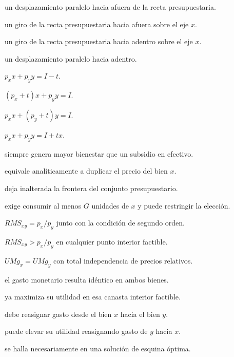 \begin{opts}
    \item un desplazamiento paralelo hacia afuera de la recta presupuestaria.
    \item un giro de la recta presupuestaria hacia afuera sobre el eje $x$.
    \item un giro de la recta presupuestaria hacia adentro sobre el eje $x$.
    \item un desplazamiento paralelo hacia adentro.
\end{opts}

\begin{opts}
    \item $p_xx+p_yy=I-t$.
    \item $(p_x+t)x+p_yy=I$.
    \item $p_xx+(p_y+t)y=I$.
    \item $p_xx+p_yy=I+tx$.
\end{opts}

\begin{opts}
    \item siempre genera mayor bienestar que un subsidio en efectivo.
    \item equivale analíticamente a duplicar el precio del bien $x$.
    \item deja inalterada la frontera del conjunto presupuestario.
    \item exige consumir al menos $G$ unidades de $x$ y puede restringir la elección.
\end{opts}

\begin{opts}
    \item $RMS_{xy}=p_x/p_y$ junto con la condición de segundo orden.
    \item $RMS_{xy}>p_x/p_y$ en cualquier punto interior factible.
    \item $UMg_x=UMg_y$ con total independencia de precios relativos.
    \item el gasto monetario resulta idéntico en ambos bienes.
\end{opts}

\begin{opts}
    \item ya maximiza su utilidad en esa canasta interior factible.
    \item debe reasignar gasto desde el bien $x$ hacia el bien $y$.
    \item puede elevar su utilidad reasignando gasto de $y$ hacia $x$.
    \item se halla necesariamente en una solución de esquina óptima.
\end{opts}

